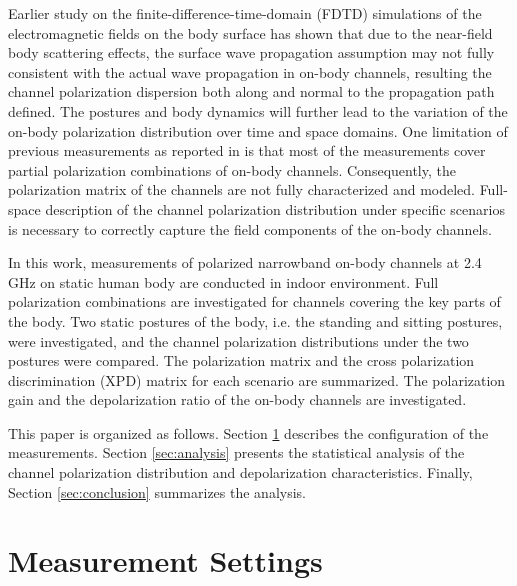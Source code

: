 \documentclass[conference]{IEEEtran}
\begin{document}
Earlier study on the finite-difference-time-domain (FDTD) simulations of the electromagnetic fields on the body surface \cite{manuscriptMap2017} has shown that due to the near-field body scattering effects, the surface wave propagation assumption may not fully consistent with the actual wave propagation in on-body channels, resulting the channel polarization dispersion both along and normal to the propagation path defined. The postures and body dynamics will further lead to the variation of the on-body polarization distribution over time and space domains. One limitation of previous measurements as reported in \cite{6,7,8} is that most of the measurements cover partial polarization combinations of on-body channels. Consequently, the polarization matrix of the channels are not fully characterized and modeled. Full-space description of the channel polarization distribution under specific scenarios is necessary to correctly capture the field components of the on-body channels.

In this work, measurements of polarized narrowband on-body channels at 2.4 GHz on static human body are conducted in indoor environment. Full polarization combinations are investigated for channels covering the key parts of the body. Two static postures of the body, i.e. the standing and sitting postures, were investigated, and the channel polarization distributions under the two postures were compared. The polarization matrix and the cross polarization discrimination (XPD) matrix for each scenario are summarized. The polarization gain and the depolarization ratio of the on-body channels are investigated.

This paper is organized as follows. Section \ref{sec:setup} describes the configuration of the measurements. Section \ref{sec:analysis} presents the statistical analysis of the channel polarization distribution and depolarization characteristics. Finally, Section \ref{sec:conclusion} summarizes the analysis.

\section{Measurement Settings}\label{sec:setup}
\end{document}
